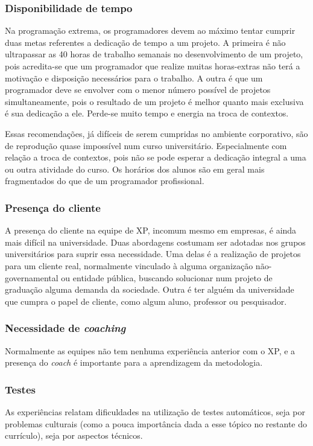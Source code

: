     \subsubsection{Disponibilidade de tempo}
      Na programação extrema, os programadores devem ao máximo tentar cumprir duas metas referentes a dedicação de tempo a um projeto. A primeira é não ultrapassar as 40 horas de trabalho semanais no desenvolvimento de um projeto, pois acredita-se que um programador que realize muitas horas-extras não terá a motivação e disposição necessários para o trabalho. A outra é que um programador deve se envolver com o menor número possível de projetos simultaneamente, pois o resultado de um projeto é melhor quanto mais exclusiva é sua dedicação a ele. Perde-se muito tempo e energia na troca de contextos. 

      Essas recomendações, já difíceis de serem cumpridas no ambiente corporativo, são de reprodução quase impossível num curso universitário. Especialmente com relação a troca de contextos, pois não se pode esperar a dedicação integral a uma ou outra atividade do curso. Os horários dos alunos são em geral mais fragmentados do que de um programador profissional.

    \subsubsection{Presença do cliente}
      A presença do cliente na equipe de XP, incomum mesmo em empresas, é ainda mais difícil na universidade. Duas abordagens costumam ser adotadas nos grupos universitários para suprir essa necessidade. Uma delas é a realização de projetos para um cliente real, normalmente vinculado à alguma organização não-governamental ou entidade pública, buscando solucionar num projeto de graduação alguma demanda da sociedade. Outra é ter alguém da universidade que cumpra o papel de cliente, como algum aluno, professor ou pesquisador.

    \subsubsection{Necessidade de \textit{coaching}}
      Normalmente as equipes não tem nenhuma experiência anterior com o XP, e a presença do \textit{coach} é importante para a aprendizagem da metodologia.

    \subsubsection{Testes}
      As experiências relatam dificuldades na utilização de testes automáticos, seja por problemas culturais (como a pouca importância dada a esse tópico no restante do currículo), seja por aspectos técnicos.

